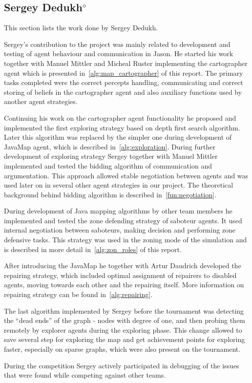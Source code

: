 \subsection[Sergey Dedukh]{Sergey Dedukh$^{\diamond}$}
This section lists the work done by Sergey Dedukh.

Sergey's contribution to the project was mainly related to development and testing of agent behaviour and communication in Jason.
He started his work together with Manuel Mittler and Micheal Ruster implementing the cartographer agent which is presented in~\autoref{alg:map_cartographer} of this report.
The primary tasks completed were the correct percepts handling, communicating and correct storing of beliefs in the cartographer agent and also auxiliary functions used by another agent strategies.

Continuing his work on the cartographer agent functionality he proposed and implemented the first exploring strategy based on depth first search algorithm.
Later this algorithm was replaced by the simpler one during development of JavaMap agent, which is described in~\autoref{alg:exploration}.
During further development of exploring strategy Sergey together with Manuel Mittler implemented and tested the bidding algorithm of communication and argumentation.
This approach allowed stable negotiation between agents and was used later on in several other agent strategies in our project. 
The theoretical background behind bidding algorithm is described in~\autoref{fun:negotiation}.

During development of Java mapping algorithms by other team members he implemented and tested the zone defending strategy of saboteur agents.
It used internal negotiation between saboteurs, making decision and performing zone defensive tasks.
This strategy was used in the zoning mode of the simulation and is described in more detail in~\autoref{alg:zon_roles} of this report.

After introducing the JavaMap he together with Artur Daudrich developed the repairing strategy, which included optimal assignment of repairers to disabled agents, moving towards each other and the repairing itself.
More information on repairing strategy can be found in~\autoref{alg:repairing}.

The last algorithm implemented by Sergey before the tournament was detecting the ``dead ends'' of the graph - nodes with degree of one, and then probing them remotely by explorer agents during the exploring phase. This change allowed to save several step for exploring the map and get achievement points for exploring faster, especially on sparse graphs, which were also present on the tournament.

During the competition Sergey actively participated in debugging of the issues that were found while competing against other teams. 